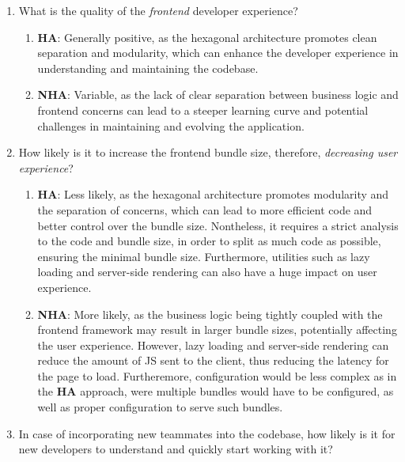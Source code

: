 \documentclass[../design.tex]{subfiles}
\begin{document}
\begin{enumerate}
	\item What is the quality of the \emph{frontend} developer experience?
	      \begin{enumerate}[label=-]
		      \item \textbf{HA}: Generally positive, as the hexagonal architecture
		            promotes clean separation and modularity, which can enhance the
		            developer experience in understanding and maintaining the codebase.
		      \item \textbf{NHA}: Variable, as the lack of clear separation between
		            business logic and frontend concerns can lead to a steeper learning
		            curve and potential challenges in maintaining and evolving the
		            application.
	      \end{enumerate}
	\item How likely is it to increase the frontend bundle size, therefore,
	      \emph{decreasing user experience}?
	      \begin{enumerate}[label=-]
		      \item \textbf{HA}: Less likely, as the hexagonal architecture promotes
		            modularity and the separation of concerns, which can lead to more
		            efficient code and better control over the bundle size.
		            Nontheless, it requires a strict analysis to the code and
		            bundle size, in order to split as much code as possible,
		            ensuring the minimal bundle size. Furthermore, utilities
		            such as lazy loading and server-side rendering can also have
		            a huge impact on user experience.
		      \item \textbf{NHA}: More likely, as the business logic being tightly
		            coupled with the frontend framework may result in larger bundle
		            sizes, potentially affecting the user experience. However,
		            lazy loading and server-side rendering can reduce the amount
		            of JS sent to the client, thus reducing the latency for the
		            page to load. Furtheremore, configuration would be less
		            complex as in the \textbf{HA} approach, were multiple
		            bundles would have to be configured, as well as proper
		            configuration to serve such bundles.
	      \end{enumerate}
	\item In case of incorporating new teammates into the codebase, how likely
	      is it for new developers to understand and quickly start working with it?

\end{enumerate}
\end{document}
